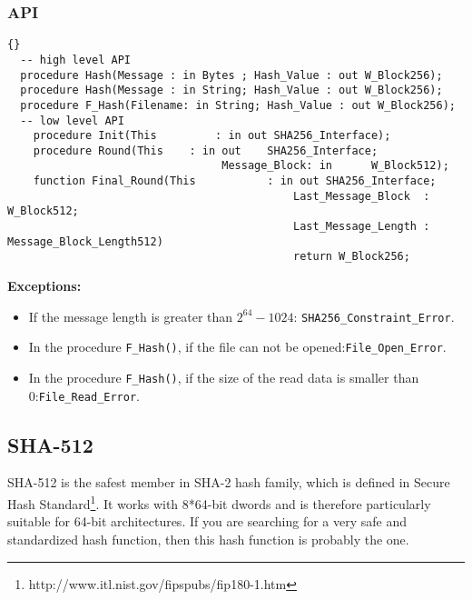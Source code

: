 \subsubsection*{API}
\begin{lstlisting}{}
  -- high level API
  procedure Hash(Message : in Bytes ; Hash_Value : out W_Block256);
  procedure Hash(Message : in String; Hash_Value : out W_Block256);
  procedure F_Hash(Filename: in String; Hash_Value : out W_Block256);
  -- low level API
	procedure Init(This 		: in out SHA256_Interface);
	procedure Round(This 	: in out 	SHA256_Interface;
								 Message_Block: in 		W_Block512);
	function Final_Round(This 		    : in out SHA256_Interface;
											Last_Message_Block  : W_Block512;
											Last_Message_Length : Message_Block_Length512)
											return W_Block256;\end{lstlisting}
\textbf{Exceptions:}
\begin{itemize}
\item If the message length is greater than $2^{64}-1024$:\quad
  \texttt{SHA256\_Constraint\_Error}.
\item In the procedure \texttt{F\_Hash()}, if the file can not be
  opened:\quad\texttt{File\_Open\_Error}.
\item In the procedure \texttt{F\_Hash()}, if the size of the read
  data is smaller than 0:\quad\texttt{File\_Read\_Error}.
\end{itemize}


\subsection{SHA-512}
SHA-512 is the safest member in SHA-2 hash family, which is defined in
Secure Hash
Standard\footnote{http://www.itl.nist.gov/fipspubs/fip180-1.htm}. It
works with 8*64-bit dwords and is therefore particularly suitable for
64-bit architectures. If you are searching for a very safe and
standardized hash function, then this hash function is probably the
one.


